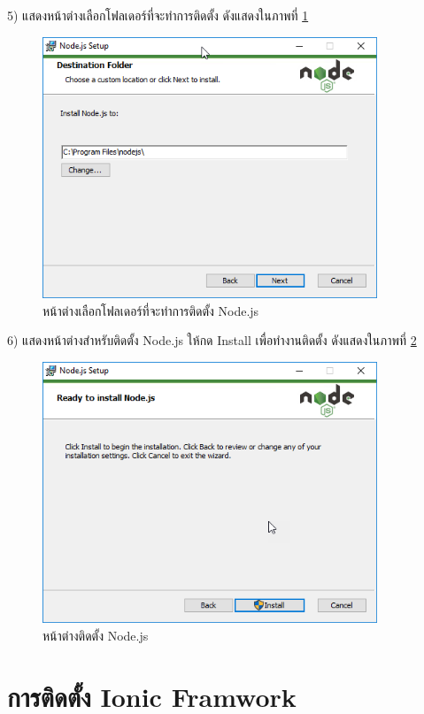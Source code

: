     5) แสดงหน้าต่างเลือกโฟลเดอร์ที่จะทำการติดตั้ง ดังแสดงในภาพที่ \ref{Fig:nodeInstall5}
      \begin{figure}[H]
            \centering
            \includegraphics[width=10cm]{Figures/7/5}
            \caption{หน้าต่างเลือกโฟลเดอร์ที่จะทำการติดตั้ง Node.js}
            \label{Fig:nodeInstall5}
      \end{figure}

    6) แสดงหน้าต่างสำหรับติดตั้ง Node.js ให้กด Install เพื่อทำงานติดตั้ง ดังแสดงในภาพที่ \ref{Fig:nodeInstall6}
        \begin{figure}[H]
            \centering
            \includegraphics[width=10cm]{Figures/7/6}
            \caption{หน้าต่างติดตั้ง Node.js}
            \label{Fig:nodeInstall6}
        \end{figure}

\section{การติดตั้ง Ionic Framwork}

